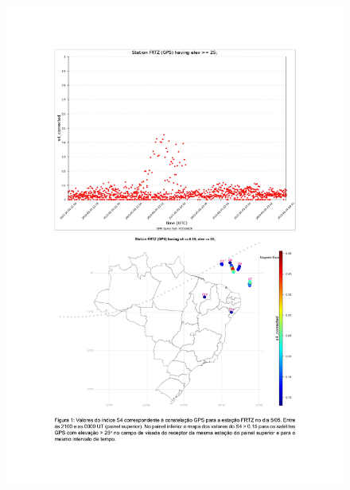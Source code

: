 \documentclass[11pt, oneside]{article}
\begin{document}
    \begin{figure}[H]
        \centering
        \includegraphics[width=14cm]{./figures/en_outfileScint_0.jpg}
    \end{figure} 
 
\end{document}
